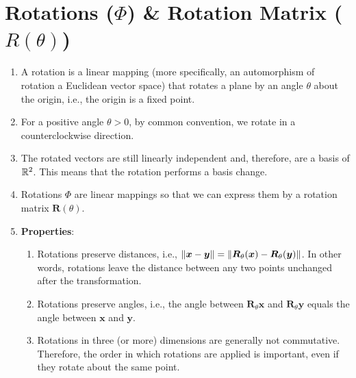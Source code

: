 \section{Rotations ($\Phi$) \& Rotation Matrix ($R(\theta)$)}



\begin{enumerate}
    \item A rotation is a linear mapping (more specifically, an automorphism of rotation a Euclidean vector space) that rotates a plane by an angle $\theta$ about the origin, i.e., the origin is a fixed point.
    \hfill \cite{mfml/book/mml/Deisenroth-Faisal-Ong}

    \item For a positive angle $\theta > 0$, by common convention, we rotate in a counterclockwise direction.
    \hfill \cite{mfml/book/mml/Deisenroth-Faisal-Ong}

    \item The rotated vectors are still linearly independent and, therefore, are a basis of $\mathbb{R}^2$.
    This means that the rotation performs a basis change.
    \hfill \cite{mfml/book/mml/Deisenroth-Faisal-Ong}

    \item Rotations $\Phi$ are linear mappings so that we can express them by a rotation matrix $\bm{R}(\theta)$.
    \hfill \cite{mfml/book/mml/Deisenroth-Faisal-Ong}

    \item \textbf{Properties}:
    \begin{enumerate}
        \item Rotations preserve distances, i.e., $\left\| \bm{x}-\bm{y} \right\| = \left\| \bm{R}_\theta (\bm{x}) - \bm{R}_\theta (\bm{y}) \right\|$. In other words, rotations leave the distance between any two points unchanged after the transformation.
        \hfill \cite{mfml/book/mml/Deisenroth-Faisal-Ong}

        \item Rotations preserve angles, i.e., the angle between $\bm{R}_\theta \bm{x}$ and $\bm{R}_\theta \bm{y}$ equals the angle between $\bm{x}$ and $\bm{y}$.
        \hfill \cite{mfml/book/mml/Deisenroth-Faisal-Ong}

        \item Rotations in three (or more) dimensions are generally not commutative.
        Therefore, the order in which rotations are applied is important, even if they rotate about the same point.
        \hfill \cite{mfml/book/mml/Deisenroth-Faisal-Ong}


\end{enumerate}
\end{enumerate}
